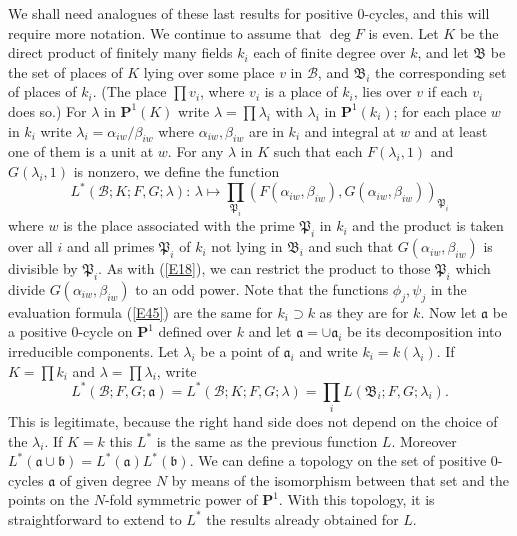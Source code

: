 \documentclass[12pt]{article}
\def\bP{{\mathbf P}}
\def\fa{{\mathfrak a}}
\def\fb{{\mathfrak b}}
\def\fB{{\mathfrak B}}
\def\fP{{\mathfrak P}}
\def\ga{{\alpha}}
\def\gb{{\beta}}
\def\gl{{\lambda}}
\def\sB{{\mathcal B}}
\def\beq{\begin{equation} \label}
\begin{document}
We shall need analogues of these last results for positive 0-cycles, and this
will require more notation. We continue to assume that $\deg F$ is even.
Let $K$ be the direct product of finitely many
fields $k_i$ each of finite degree over $k$, and let $\fB$ be the set of
places of $K$ lying over some place $v$ in $\sB$, and $\fB_i$ the
corresponding set of places of $k_i$. (The place $\prod v_i$,
where $v_i$ is a place of $k_i$, lies over $v$ if each $v_i$ does so.) For
$\gl$ in $\bP^1(K)$ write $\gl=\prod\gl_i$ with $\gl_i$ in $\bP^1(k_i)$; for
each place $w$ in $k_i$ write $\gl_i=\ga_{iw}/\gb_{iw}$ where $\ga_{iw},
\gb_{iw}$ are in $k_i$ and integral at $w$
and at least one of them is a unit at $w$.
For any $\gl$ in $K$ such that each $F(\gl_i,1)$
and $G(\gl_i,1)$ is nonzero, we define the function
\beq{E13} L^*(\sB;K;F,G;\gl):\,\gl\mapsto\prod_{\fP_i}(F(\ga_{iw},\gb_{iw}),
G(\ga_{iw},\gb_{iw}))_{\fP_i} \end{equation}
where $w$ is the place associated with the prime $\fP_i$ in $k_i$ and
the product is taken over all $i$ and all primes $\fP_i$ of $k_i$ not
lying in $\fB_i$ and such that $G(\ga_{iw},\gb_{iw})$ is divisible by $\fP_i$.
As with (\ref{E18}), we can restrict the product to those $\fP_i$ which divide
$G(\ga_{iw},\gb_{iw})$ to an odd power.
Note that the functions $\phi_j,\psi_j$ in the evaluation formula (\ref{E45})
are the same for $k_i\supset k$ as they are for $k$.
Now let $\fa$ be a positive 0-cycle on $\bP^1$
defined over $k$ and let $\fa=\cup\fa_i$
be its decomposition into irreducible components. Let $\gl_i$
be a point of $\fa_i$ and write $k_i=k(\gl_i)$. If $K=\prod k_i$ and $\gl=
\prod\gl_i$, write
\beq{E21} L^*(\sB;F,G;\fa)=L^*(\sB;K;F,G;\gl)={\prod}_iL(\fB_i;F,G;\gl_i).
\end{equation}
This is legitimate, because the right hand side does not depend on the choice
of the $\gl_i$.
If $K=k$ this $L^*$ is the same as the previous function $L$.
Moreover $L^*(\fa\cup\fb)=L^*(\fa)L^*(\fb)$.
We can define a topology on the set of positive 0-cycles $\fa$ of given degree
$N$ by means of the isomorphism between that set and the points on the $N$-fold
symmetric power of $\bP^1$. With this topology,
it is straightforward to extend to $L^*$ the
results already obtained for $L$.
\end{document}
